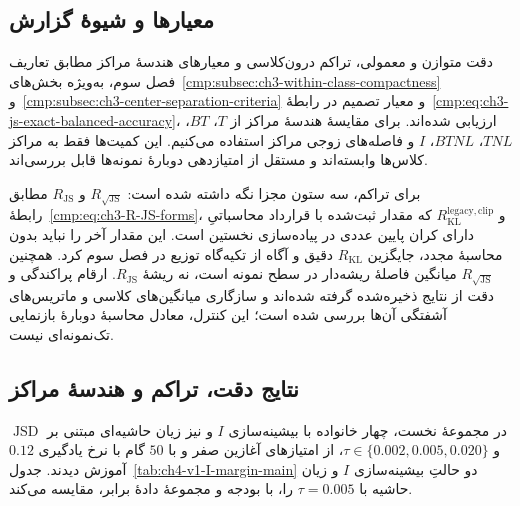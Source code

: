 \subsection{معیارها و شیوهٔ گزارش}

دقت متوازن و معمولی، تراکم درون‌کلاسی و معیارهای هندسهٔ مراکز مطابق تعاریف فصل سوم، به‌ویژه بخش‌های~\ref{cmp:subsec:ch3-within-class-compactness} و~\ref{cmp:subsec:ch3-center-separation-criteria} و معیار تصمیم در رابطهٔ~\eqref{cmp:eq:ch3-js-exact-balanced-accuracy}، ارزیابی شده‌اند. برای مقایسهٔ هندسهٔ مراکز از $T$، $BT$، $TNL$، $BTNL$، $I$ و فاصله‌های زوجی مراکز استفاده می‌کنیم. این کمیت‌ها فقط به مراکز کلاس‌ها وابسته‌اند و مستقل از امتیازدهی دوبارهٔ نمونه‌ها قابل بررسی‌اند.

برای تراکم، سه ستون مجزا نگه داشته شده است: $R_{\sqrt{\mathrm{JS}}}$ و $R_{\mathrm{JS}}$ مطابق رابطهٔ~\eqref{cmp:eq:ch3-R-JS-forms}، و $R_{\mathrm{KL}}^{\mathrm{legacy,clip}}$ که مقدار ثبت‌شده با قرارداد محاسباتیِ دارای کران پایین عددی در پیاده‌سازی نخستین است. این مقدار آخر را نباید بدون محاسبهٔ مجدد، جایگزین $R_{\mathrm{KL}}$ دقیق و آگاه از تکیه‌گاه توزیع در فصل سوم کرد. همچنین $R_{\sqrt{\mathrm{JS}}}$ میانگین فاصلهٔ ریشه‌دار در سطح نمونه است، نه ریشهٔ $R_{\mathrm{JS}}$. ارقام پراکندگی و دقت از نتایج ذخیره‌شده گرفته شده‌اند و سازگاری میانگین‌های کلاسی و ماتریس‌های آشفتگی آن‌ها بررسی شده است؛ این کنترل، معادل محاسبهٔ دوبارهٔ بازنمایی تک‌نمونه‌ای نیست.

\subsection{نتایج دقت، تراکم و هندسهٔ مراکز}
\label{subsec:ch4-v1-I-margin-results}

در مجموعهٔ نخست، چهار خانواده با بیشینه‌سازی $I$ و نیز زیان حاشیه‌ای مبتنی بر $\operatorname{JSD}$ و $\tau\in\{0.002,0.005,0.020\}$، از امتیازهای آغازین صفر و با $50$ گام  با نرخ یادگیری $0.12$ آموزش دیدند. جدول~\ref{tab:ch4-v1-I-margin-main} دو حالتِ بیشینه‌سازی $I$ و زیان حاشیه با $\tau=0.005$ را، با بودجه و مجموعهٔ دادهٔ برابر، مقایسه می‌کند.

